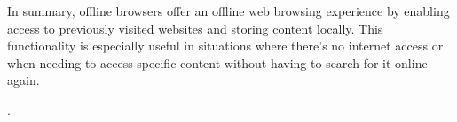 \documentclass{article}
\begin{document}
In summary, offline browsers offer an offline web browsing experience by enabling access to previously visited websites and storing content locally. This functionality is especially useful in situations where there's no internet access or when needing to access specific content without having to search for it online again.

\pagebreak

\citep{digital55, cyberstream, linkedin, fili, techtarget}.
   
\end{document}
